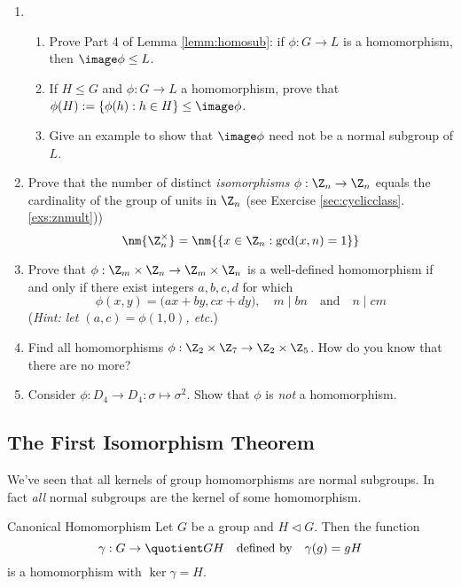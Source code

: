 \begin{exercises}{}{}
\begin{enumerate}
	
		\item\begin{enumerate}
		  \item Prove Part 4 of Lemma \ref{lemm:homosub}: if $\phi:G\to L$ is a homomorphism, then $\image\phi\le L$.
		 	\item If $H\le G$ and $\phi:G\to L$ a homomorphism, prove that $\phi(H):=\{\phi(h):h\in H\}\le\image\phi$.
		  \item Give an example to show that $\image\phi$ need not be a normal subgroup of $L$.
		\end{enumerate}
	
		
		\item\label{exs:totient} Prove that the number of distinct \emph{isomorphisms} $\phi:\Z_n\to\Z_n$ equals the cardinality of the group of units in $\Z_n$ (see Exercise \ref*{sec:cyclicclass}.\ref{exs:znmult}))
		\[
			\nm{\Z_n^\times}=\nm{\{x\in\Z_n:\gcd(x,n)=1\}}
		\]
			
			  
	  \item Prove that $\phi:\Z_m\times\Z_n\to\Z_m\times\Z_n$ is a well-defined homomorphism if and only if there exist integers $a,b,c,d$ for which
	  \[
	  	\phi(x,y)=\bigl(ax+by,cx+dy\bigr),\quad 
	  	m\mid bn\quad
	  	\text{and}\quad n\mid cm
	  \]
	  (\emph{Hint: let $(a,c)=\phi(1,0)$, etc.})
	  
	
		\item Find all homomorphisms $\phi:\Z_2\times\Z_7\to\Z_2\times\Z_5$. How do you know that there are no more?
		
		  
	  \item Consider $\phi:D_4\to D_4:\sigma\mapsto \sigma^2$. Show that $\phi$ is \emph{not} a homomorphism.
		
	\end{enumerate}
\end{exercises}

\clearpage



\subsection{The First Isomorphism Theorem}\label{sec:1stiso}

We've seen that all kernels of group homomorphisms are normal subgroups. In fact \emph{all} normal subgroups are the kernel of some homomorphism.

\begin{thm}{Canonical Homomorphism}{}
	Let $G$ be a group and $H\triangleleft G$. Then the function
	\[
		\gamma:G\to \quotient GH
		\quad\text{defined by}\quad 
		\gamma(g)=gH
	\]
	is a homomorphism with $\ker\gamma=H$.
\end{thm}

